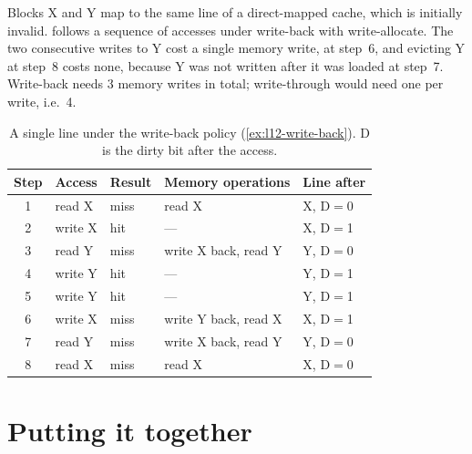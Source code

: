 \documentclass[../main.tex]{subfiles}
\begin{document}
\begin{example}
  \label{ex:l12-write-back}
  Blocks X and Y map to the same line of a direct-mapped cache, which is
  initially invalid.   follows a sequence of
  accesses under write-back with write-allocate.  The two consecutive writes
  to Y cost a single memory write, at step~6, and evicting Y at step~8 costs
  none, because Y was not written after it was loaded at
  step~7.  Write-back needs 3 memory writes in total;
  write-through would need one per write, i.e.~4.
\end{example}

\begin{table}[htbp]
  \centering\small
  \caption{A single line under the write-back policy
    (\cref{ex:l12-write-back}).  D is the dirty bit after the access.}
  \label{tab:l12-write-back}
  \begin{tabular}{@{}cllll@{}}
    \toprule
    Step & Access  & Result & Memory operations        & Line after \\
    \midrule
    1    & read X  & miss   & read X                    & X, D$=$0 \\
    2    & write X & hit    & ---                       & X, D$=$1 \\
    3    & read Y  & miss   & write X back, read Y      & Y, D$=$0 \\
    4    & write Y & hit    & ---                       & Y, D$=$1 \\
    5    & write Y & hit    & ---                       & Y, D$=$1 \\
    6    & write X & miss   & write Y back, read X      & X, D$=$1 \\
    7    & read Y  & miss   & write X back, read Y      & Y, D$=$0 \\
    8    & read X  & miss   & read X                    & X, D$=$0 \\
    \bottomrule
  \end{tabular}
\end{table}

\section{Putting it together}
\label{sec:l12-summary}
\end{document}
